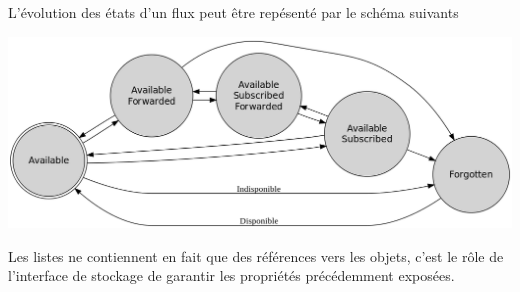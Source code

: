L'évolution des états d'un flux peut être repésenté par le schéma suivants

\begin{center}
    \includegraphics[width=1\textwidth]{img/state.png}
\end{center}

Les listes ne contiennent en fait que des références vers les objets, c'est le rôle de l'interface de
stockage de garantir les propriétés précédemment exposées. \\

